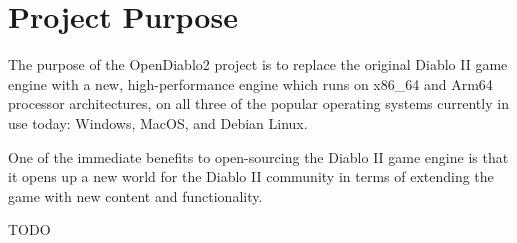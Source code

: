 \section{Project Purpose} \label{sec:project_purpose}


The purpose of the OpenDiablo2 project is to replace the original Diablo II
game engine with a new, high-performance engine which runs on x86\_64 and Arm64
processor architectures, on all three of the popular operating systems currently
in use today: Windows, MacOS, and Debian Linux.

One of the immediate benefits to open-sourcing the Diablo II game engine is that
it opens up a new world for the Diablo II community in terms of extending the
game with new content and functionality.

TODO
